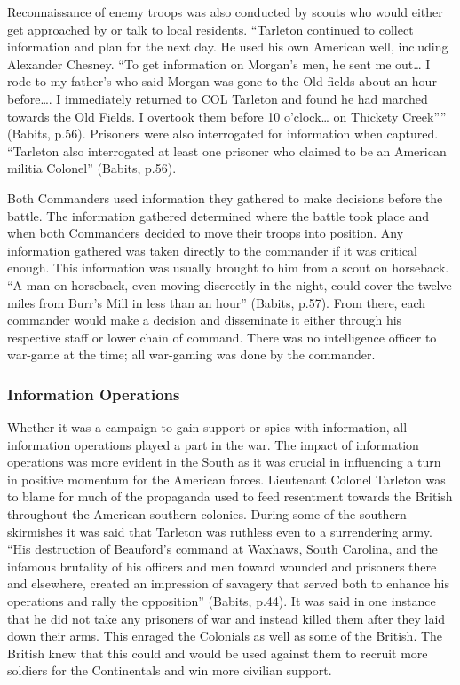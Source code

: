 Reconnaissance of enemy troops was also conducted by scouts who would either get
approached by or talk to local residents.  “Tarleton continued to collect
information and plan for the next day.  He used his own American well, including
Alexander Chesney.  “To get information on Morgan’s men, he sent me out… I rode
to my father’s who said Morgan was gone to the Old-fields about an hour before….
I immediately returned to COL Tarleton and found he had marched towards the Old
Fields.  I overtook them before 10 o’clock… on Thickety Creek”” (Babits, p.56).
Prisoners were also interrogated for information when captured.  “Tarleton also
interrogated at least one prisoner who claimed to be an American militia
Colonel” (Babits, p.56).

Both Commanders used information they gathered to make decisions before the
battle.  The information gathered determined where the battle took place and
when both Commanders decided to move their troops into position.  Any
information gathered was taken directly to the commander if it was critical
enough.  This information was usually brought to him from a scout on horseback.
“A man on horseback, even moving discreetly in the night, could cover the twelve
miles from Burr’s Mill in less than an hour” (Babits, p.57).  From there, each
commander would make a decision and disseminate it either through his respective
staff or lower chain of command.  There was no intelligence officer to war-game
at the time; all war-gaming was done by the commander. 

\subsubsection{Information Operations}

Whether it was a campaign to gain support or spies with information, all
information operations played a part in the war.  The impact of information
operations was more evident in the South as it was crucial in influencing a turn
in positive momentum for the American forces. Lieutenant Colonel Tarleton was to
blame for much of the propaganda used to feed resentment towards the British
throughout the American southern colonies. During some of the southern
skirmishes it was said that Tarleton was ruthless even to a surrendering army.
“His destruction of Beauford’s command at Waxhaws, South Carolina, and the
infamous brutality of his officers and men toward wounded and prisoners there
and elsewhere, created an impression of savagery that served both to enhance his
operations and rally the opposition” (Babits, p.44).  It was said in one
instance that he did not take any prisoners of war and instead killed them after
they laid down their arms. This enraged the Colonials as well as some of the
British.  The British knew that this could and would be used against them to
recruit more soldiers for the Continentals and win more civilian support.  

